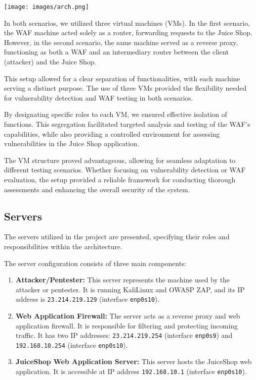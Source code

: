 \documentclass[12pt]{article}
\begin{document}
\begin{center}
    \texttt{[image: images/arch.png]}
\end{center}

In both scenarios, we utilized three virtual machines (VMs). In the first scenario, the WAF machine acted solely as a router, forwarding requests to the Juice Shop. However, in the second scenario, the same machine served as a reverse proxy, functioning as both a WAF and an intermediary router between the client (attacker) and the Juice Shop.

This setup allowed for a clear separation of functionalities, with each machine serving a distinct purpose. The use of three VMs provided the flexibility needed for vulnerability detection and WAF testing in both scenarios.

By designating specific roles to each VM, we ensured effective isolation of functions. This segregation facilitated targeted analysis and testing of the WAF's capabilities, while also providing a controlled environment for assessing vulnerabilities in the Juice Shop application.

The VM structure proved advantageous, allowing for seamless adaptation to different testing scenarios. Whether focusing on vulnerability detection or WAF evaluation, the setup provided a reliable framework for conducting thorough assessments and enhancing the overall security of the system.

\subsection{Servers}
The servers utilized in the project are presented, specifying their roles and responsibilities within the architecture.

The server configuration consists of three main components:

\begin{enumerate}
  \item \textbf{Attacker/Pentester:} This server represents the machine used by the attacker or pentester. It is running KaliLinux and OWASP ZAP, and its IP address is \texttt{23.214.219.129} (interface \texttt{enp0s10}).

  \item \textbf{Web Application Firewall:} The server acts as a reverse proxy and web application firewall. It is responsible for filtering and protecting incoming traffic. It has two IP addresses: \texttt{23.214.219.254} (interface \texttt{enp0s9}) and \texttt{192.168.10.254} (interface \texttt{enp0s10}).

  \item \textbf{JuiceShop Web Application Server:} This server hosts the JuiceShop web application. It is accessible at IP address \texttt{192.168.10.1} (interface \texttt{enp0s10}).
\end{enumerate}
\end{document}
